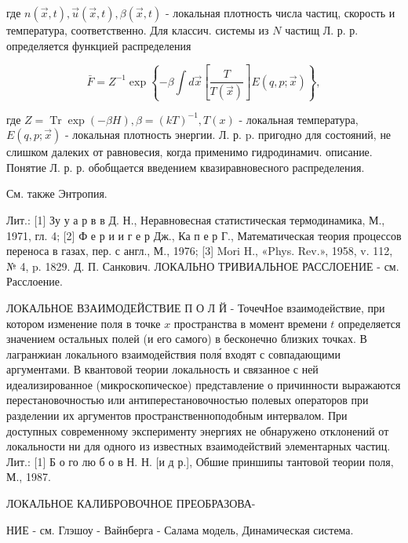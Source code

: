 \documentclass[10pt]{article}
\begin{document}
где $n(\vec{x}, t), \vec{u}(\vec{x}, t), \beta(\vec{x}, t)$ - локальная плотность числа частиц, скорость и температура, соответственно. Для классич. системы из $N$ частищ Л. р. р. определяется функцией распределения



\[

\bar{F}=Z^{-1} \exp \left\{-\beta \int d \vec{x}\left[\frac{T}{T(\vec{x})}\right] E(q, p ; \vec{x})\right\},

\]



где $Z=\operatorname{Tr} \exp (-\beta H), \beta=(k T)^{-1}, T(x)$ - локальная температура, $E(q, p ; \vec{x})$ - локальная плотность энергии. Л. р. p. пригодно для состояний, не слишком далеких от равновесия, когда применимо гидродинамич. описание. Понятие Л. р. р. обобщается введением квазиравновесного распределения.



См. также Энтропия.



Лит.: [1] Зу у а р в в Д. Н., Неравновесная статистическая термодинамика, М., 1971, гл. 4; [2] Ф е р и и г е р Дж., Ка п е р Г., Математическая теория процессов переноса в газах, пер. с англ., М., 1976; [3] Mori H., «Phys. Rev.», 1958, v. 112, № 4, p. 1829. Д. П. Санкович. ЛОКАЛЬНО ТРИВИАЛЬНОЕ РАССЛОЕНИЕ - см. Расслоение.



ЛОКАЛЬНОЕ ВЗАИМОДЕЙСТВИЕ П О Л Й - ТочечНое взаимодействие, при котором изменение поля в точке $x$ пространства в момент времени $t$ определяется значением остальных полей (и его самого) в бесконечно близких точках. В лагранжиан локального взаимодействия поля́ входят с совпадающими аргументами. В квантовой теории локальность и связанное с ней идеализированное (микроскопическое) представление о причинности выражаются перестановочностью или антиперестановочностью полевых операторов при разделении их аргументов пространственноподобным интервалом. При доступных современному эксперименту энергиях не обнаружено отклонений от локальности ни для одного из известных взаимодействий элементарных частиц. Лит.: [1] Б о го лю б о в Н. Н. [и д р.], Обшие приншипы тантовой теории поля, М., 1987.



ЛОКАЛЬНОЕ КАЛИБРОВОЧНОЕ ПРЕОБРАЗОВА-



НИЕ - см. Глэшоу - Вайнберга - Салама модель, Динамическая система.
\end{document}
